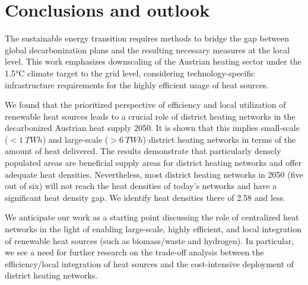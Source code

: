 \section{Conclusions and outlook}\label{conclusions}
The sustainable energy transition requires methods to bridge the gap between global decarbonization plans and the resulting necessary measures at the local level. This work emphasizes downscaling of the Austrian heating sector under the 1.5°C climate target to the grid level, considering technology-specific infrastructure requirements for the highly efficient usage of heat sources.\vspace{0.3cm}

We found that the prioritized perspective of efficiency and local utilization of renewable heat sources leads to a crucial role of district heating networks in the decarbonized Austrian heat supply 2050. It is shown that this implies small-scale ($<\SI{1}{TWh}$) and large-scale ($>\SI{6}{TWh}$) district heating networks in terms of the amount of heat delivered. The results demonstrate that particularly densely populated areas are beneficial supply areas for district heating networks and offer adequate heat densities. Nevertheless, most district heating networks in 2050 (five out of six) will not reach the heat densities of today's networks and have a significant heat density gap. We identify heat densities there of \SI{2.58}{} and less.\vspace{0.3cm}

We anticipate our work as a starting point discussing the role of centralized heat networks in the light of enabling large-scale, highly efficient, and local integration of renewable heat sources (such as biomass/waste and hydrogen). In particular, we see a need for further research on the trade-off analysis between the efficiency/local integration of heat sources and the cost-intensive deployment of district heating networks.  








